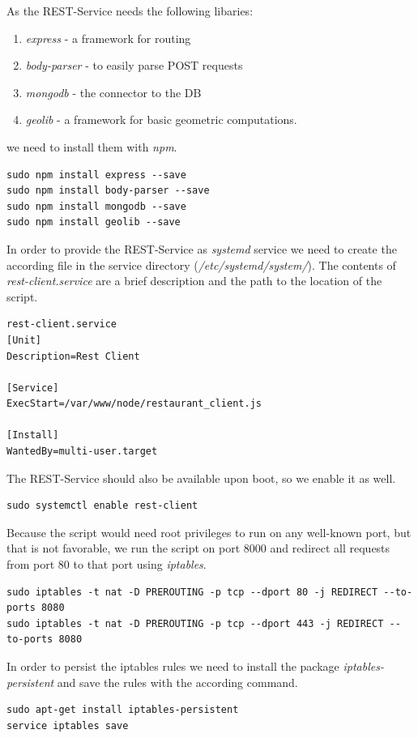 As the REST-Service needs the following libaries:
\begin{enumerate}
	\item \textit{express} - a framework for routing
	\item \textit{body-parser} - to easily parse POST requests
	\item \textit{mongodb} - the connector to the DB
	\item \textit{geolib} - a framework for basic geometric computations.
\end{enumerate}
we need to install them with \textit{npm}.
\begin{lstlisting}
sudo npm install express --save
sudo npm install body-parser --save
sudo npm install mongodb --save
sudo npm install geolib --save
\end{lstlisting}

In order to provide the REST-Service as \textit{systemd} service we need to create the according file in the service directory (\textit{/etc/systemd/system/}). The contents of \textit{rest-client.service} are a brief description and the path to the location of the script.
\begin{lstlisting}
rest-client.service
[Unit]
Description=Rest Client

[Service]
ExecStart=/var/www/node/restaurant_client.js

[Install]
WantedBy=multi-user.target
\end{lstlisting}

The REST-Service should also be available upon boot, so we enable it as well.
\begin{lstlisting}
sudo systemctl enable rest-client
\end{lstlisting}

Because the script would need root privileges to run on any well-known port, but that is not favorable, we run the script on port 8000 and redirect all requests from port 80 to that port using \textit{iptables}.
\begin{lstlisting}
sudo iptables -t nat -D PREROUTING -p tcp --dport 80 -j REDIRECT --to-ports 8080
sudo iptables -t nat -D PREROUTING -p tcp --dport 443 -j REDIRECT --to-ports 8080
\end{lstlisting}
In order to persist the iptables rules we need to install the package \textit{iptables-persistent} and save the rules with the according command.
\begin{lstlisting}
sudo apt-get install iptables-persistent
service iptables save
\end{lstlisting}

